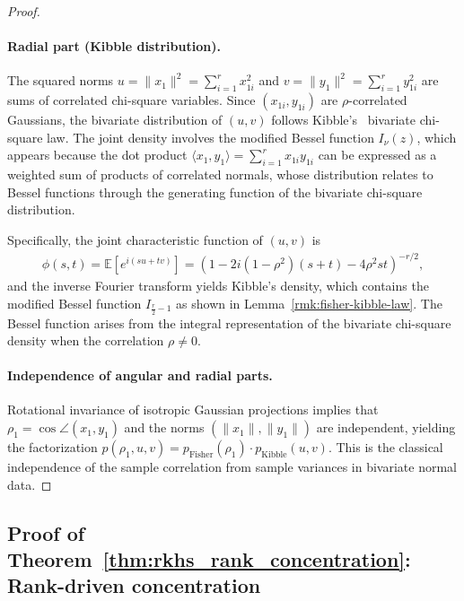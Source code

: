 \begin{proof}
\paragraph{Radial part (Kibble distribution).}
The squared norms \(u = \|x_1\|^2 = \sum_{i=1}^r x_{1i}^2\) and \(v = \|y_1\|^2 = \sum_{i=1}^r y_{1i}^2\) are sums of correlated chi-square variables. Since \((x_{1i}, y_{1i})\) are \(\rho\)-correlated Gaussians, the bivariate distribution of \((u, v)\) follows Kibble's~\cite{kibble1941two} bivariate chi-square law. The joint density involves the modified Bessel function \(I_{\nu}(z)\), which appears because the dot product \(\langle x_1, y_1 \rangle = \sum_{i=1}^r x_{1i} y_{1i}\) can be expressed as a weighted sum of products of correlated normals, whose distribution relates to Bessel functions through the generating function of the bivariate chi-square distribution.

Specifically, the joint characteristic function of \((u, v)\) is
\begin{align}
\phi(s, t) = \mathbb{E}[e^{i(su + tv)}] = \left(1 - 2i(1-\rho^2)(s+t) - 4\rho^2 st\right)^{-r/2},
\end{align}
and the inverse Fourier transform yields Kibble's density, which contains the modified Bessel function \(I_{\frac{r}{2}-1}\) as shown in Lemma~\ref{rmk:fisher-kibble-law}. The Bessel function arises from the integral representation of the bivariate chi-square density when the correlation \(\rho \neq 0\).

\paragraph{Independence of angular and radial parts.}
Rotational invariance of isotropic Gaussian projections implies that \(\rho_1 = \cos\angle(x_1, y_1)\) and the norms \((\|x_1\|, \|y_1\|)\) are independent, yielding the factorization \(p(\rho_1, u, v) = p_{\text{Fisher}}(\rho_1) \cdot p_{\text{Kibble}}(u, v)\). This is the classical independence of the sample correlation from sample variances in bivariate normal data.
\end{proof}






\subsection{Proof of Theorem~\ref{thm:rkhs_rank_concentration}: Rank-driven concentration}
\label{appendix:proof-rkhs-rank-concentration}

